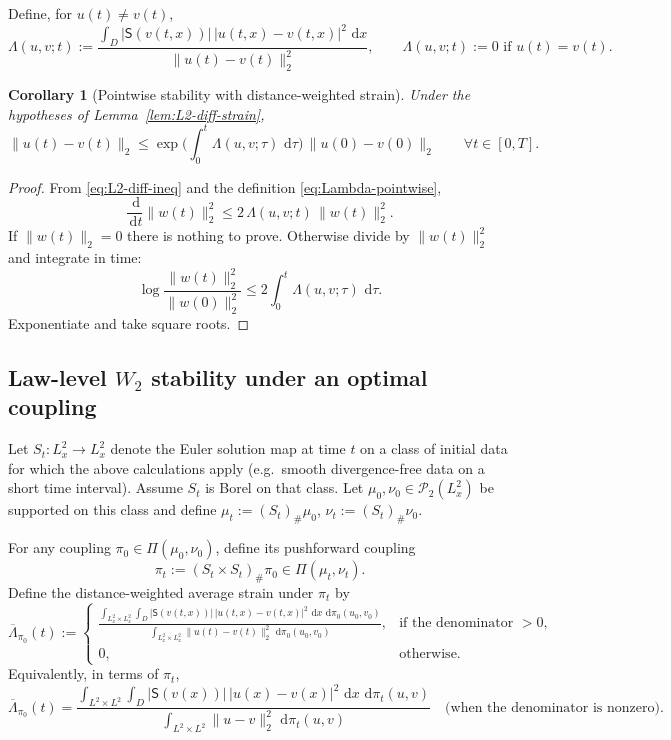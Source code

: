 \documentclass{article}
\numberwithin{equation}{section}
\theoremstyle{plain}
\newtheorem{corollary}[theorem]{Corollary}
\theoremstyle{definition}
\theoremstyle{remark}
\newcommand{\Pcal}{\mathcal{P}}
\newcommand{\dd}{\,\mathrm{d}}
\begin{document}
Define, for $u(t)\neq v(t)$,
\begin{equation}\label{eq:Lambda-pointwise}
\Lambda(u,v;t)
:=
\frac{\int_D |\mathsf S(v(t,x))|\,|u(t,x)-v(t,x)|^2\,\dd x}{\|u(t)-v(t)\|_2^2},
\qquad
\Lambda(u,v;t):=0 \text{ if }u(t)=v(t).
\end{equation}

\begin{corollary}[Pointwise stability with distance-weighted strain]\label{cor:pointwise-stab}
Under the hypotheses of Lemma~\ref{lem:L2-diff-strain},
\[
\|u(t)-v(t)\|_2
\le
\exp\Big(\int_0^t \Lambda(u,v;\tau)\,\dd\tau\Big)\,\|u(0)-v(0)\|_2
\qquad\forall t\in[0,T].
\]
\end{corollary}

\begin{proof}
From \eqref{eq:L2-diff-ineq} and the definition \eqref{eq:Lambda-pointwise},
\[
\frac{\dd}{\dd t}\|w(t)\|_2^2 \le 2\,\Lambda(u,v;t)\,\|w(t)\|_2^2.
\]
If $\|w(t)\|_2=0$ there is nothing to prove. Otherwise divide by $\|w(t)\|_2^2$ and integrate in time:
\[
\log\frac{\|w(t)\|_2^2}{\|w(0)\|_2^2}\le 2\int_0^t \Lambda(u,v;\tau)\,\dd\tau.
\]
Exponentiate and take square roots.
\end{proof}

\subsection{Law-level $W_2$ stability under an optimal coupling}

Let $S_t:L^2_x\to L^2_x$ denote the Euler solution map at time $t$ on a class of initial data for which the above calculations apply
(e.g.\ smooth divergence-free data on a short time interval). Assume $S_t$ is Borel on that class.
Let $\mu_0,\nu_0\in\Pcal_2(L^2_x)$ be supported on this class and define $\mu_t:=(S_t)_\#\mu_0$, $\nu_t:=(S_t)_\#\nu_0$.

For any coupling $\pi_0\in\Pi(\mu_0,\nu_0)$, define its pushforward coupling
\[
\pi_t := (S_t\times S_t)_\#\pi_0\in\Pi(\mu_t,\nu_t).
\]
Define the distance-weighted average strain under $\pi_t$ by
\begin{equation}\label{eq:Lambda-pi}
\overline\Lambda_{\pi_0}(t)
:=
\begin{cases}
\displaystyle
\frac{\int_{L^2_x\times L^2_x}\int_D |\mathsf S(v(t,x))|\,|u(t,x)-v(t,x)|^2\,\dd x\,\dd\pi_0(u_0,v_0)}
{\int_{L^2_x\times L^2_x}\|u(t)-v(t)\|_2^2\,\dd\pi_0(u_0,v_0)},
& \text{if the denominator $>0$,}\\[2.2ex]
0,& \text{otherwise.}
\end{cases}
\end{equation}
Equivalently, in terms of $\pi_t$,
\[
\overline\Lambda_{\pi_0}(t)
=
\frac{\int_{L^2\times L^2}\int_D |\mathsf S(v(x))|\,|u(x)-v(x)|^2\,\dd x\,\dd\pi_t(u,v)}
{\int_{L^2\times L^2}\|u-v\|_2^2\,\dd\pi_t(u,v)}
\quad\text{(when the denominator is nonzero)}.
\]
\end{document}
